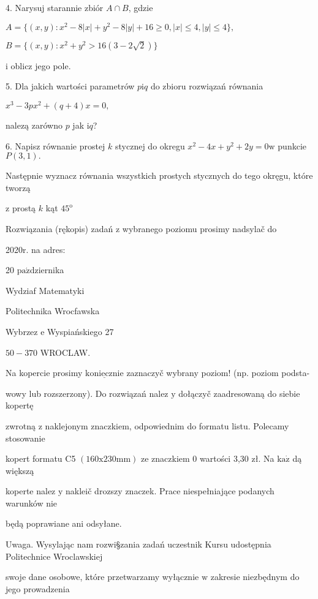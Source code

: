 \documentclass[a4paper,12pt]{article}
\begin{document}
4. Narysuj starannie zbiór $A\cap B$, gdzie

$A=\{(x,y):x^{2}-8|x|+y^{2}-8|y|+16\geq 0,|x|\leq 4,|y|\leq 4\},$

$B=\{(x,y):x^{2}+y^{2}>16(3-2\sqrt{2})\}$

$\mathrm{i}$ oblicz jego pole.

5. Dla jakich wartości parametrów $p\mathrm{i}q$ do zbioru rozwiązań równania

$x^{3}-3px^{2}+(q+4)x=0,$

nalezą zarówno $p$ jak $\mathrm{i}q$?

6. Napisz równanie prostej $k$ stycznej do okregu $x^{2}-4x+y^{2}+2y=0\mathrm{w}$ punkcie $P(3,1).$

Następnie wyznacz równania wszystkich prostych stycznych do tego okręgu, które tworzą

$\mathrm{z}$ prostą $k$ kąt $45^{\mathrm{o}}$

Rozwiązania (rękopis) zadań z wybranego poziomu prosimy nadsylač do

2020r. na adres:

20 $\mathrm{p}\mathrm{a}\acute{\mathrm{z}}$dziernika

Wydziaf Matematyki

Politechnika Wrocfawska

Wybrzez $\mathrm{e}$ Wyspiańskiego 27

$50-370$ WROCLAW.

Na kopercie prosimy $\underline{\mathrm{k}\mathrm{o}\mathrm{n}\mathrm{i}\mathrm{e}\mathrm{c}\mathrm{z}\mathrm{n}\mathrm{i}\mathrm{e}}$ zaznaczyč wybrany poziom! (np. poziom podsta-

wowy lub rozszerzony). Do rozwiązań nalez $\mathrm{y}$ dołączyč zaadresowaną do siebie kopertę

zwrotną $\mathrm{z}$ naklejonym znaczkiem, odpowiednim do formatu listu. Polecamy stosowanie

kopert formatu C5 $(160\mathrm{x}230\mathrm{m}\mathrm{m})$ ze znaczkiem $0$ wartości 3,30 zł. Na $\mathrm{k}\mathrm{a}\dot{\mathrm{z}}$ dą większą

koperte nalez $\mathrm{y}$ nakleič drozszy znaczek. Prace niespełniające podanych warunków nie

będą poprawiane ani odsyłane.

Uwaga. Wysylając nam rozwi\S zania zadań uczestnik Kursu udostępnia Politechnice Wroclawskiej

swoje dane osobowe, które przetwarzamy wyłącznie $\mathrm{w}$ zakresie niezbędnym do jego prowadzenia
\end{document}
